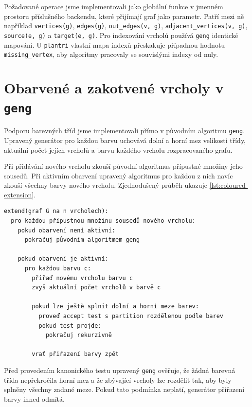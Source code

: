 Požadované operace jsme implementovali jako globální funkce v jmenném prostoru
příslušného backendu, které přijímají graf jako parametr. Patří mezi ně například
\texttt{vertices(g)}, \texttt{edges(g)}, \texttt{out\_edges(v, g)},
\texttt{adjacent\_vertices(v, g)}, \texttt{source(e, g)} a
\texttt{target(e, g)}. Pro indexování vrcholů používá \texttt{geng} identické
mapování. U \texttt{plantri} vlastní mapa indexů přeskakuje případnou hodnotu
\texttt{missing\_vertex}, aby algoritmy pracovaly se souvislými indexy od nuly.

\section{Obarvené a zakotvené vrcholy v \texttt{geng}}
\label{sec:implementation-coloured-geng}

Podporu barevných tříd jsme implementovali přímo v původním algoritmu
\texttt{geng}. Upravený generátor pro každou barvu uchovává dolní a horní mez
velikosti třídy, aktuální počet jejích vrcholů a barvu každého vrcholu
rozpracovaného grafu.

Při přidávání nového vrcholu zkouší původní algoritmus přípustné množiny jeho
sousedů. Při aktivním obarvení upravený algoritmus pro každou z nich navíc
zkouší všechny barvy nového vrcholu. Zjednodušený průběh ukazuje
\cref{lst:coloured-extension}.

\begin{listing}
\begin{Verbatim}[fontsize=\footnotesize]
extend(graf G na n vrcholech):
  pro každou přípustnou množinu sousedů nového vrcholu:
    pokud obarvení není aktivní:
      pokračuj původním algoritmem geng

    pokud obarvení je aktivní:
      pro každou barvu c:
        přiřaď novému vrcholu barvu c
        zvyš aktuální počet vrcholů v barvě c

        pokud lze ještě splnit dolní a horní meze barev:
          proveď accept test s partition rozdělenou podle barev
          pokud test projde:
            pokračuj rekurzivně

        vrať přiřazení barvy zpět
\end{Verbatim}
\caption{Zjednodušené rozšíření grafu o obarvený vrchol.}
\label{lst:coloured-extension}
\end{listing}

Před provedením kanonického testu upravený \texttt{geng} ověřuje, že žádná
barevná třída nepřekročila horní mez a že zbývající vrcholy lze rozdělit tak,
aby byly splněny všechny zadané meze. Pokud tato podmínka neplatí, generátor
přiřazení barvy ihned odmítá.

